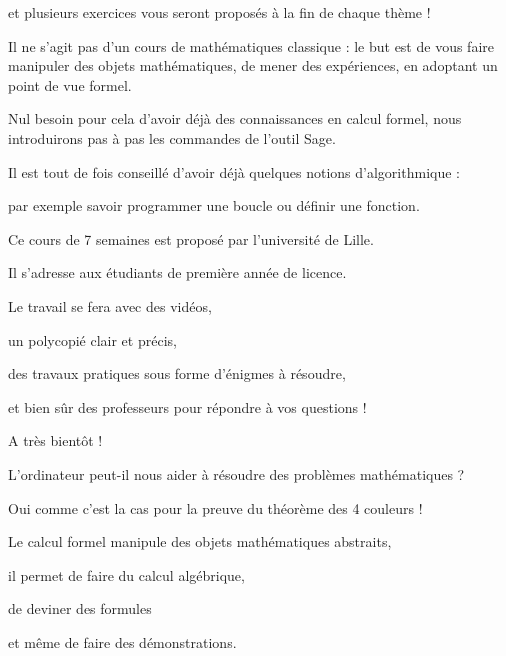 et plusieurs exercices vous seront proposés à la fin de chaque thème ! 

\change
 
Il ne s'agit pas d'un cours de mathématiques classique : le but est de vous faire manipuler des objets mathématiques, 
de mener des expériences, en adoptant un point de vue formel.

\change
Nul besoin pour cela d'avoir déjà des connaissances en calcul formel, nous introduirons pas à pas les commandes de l'outil Sage. 

\change
Il est tout de fois conseillé d'avoir déjà quelques notions d'algorithmique :

\change
par exemple savoir programmer une boucle ou définir une fonction.

\change

\change
Ce cours de 7 semaines est proposé par l'université de Lille.

Il s'adresse aux étudiants de première année de licence.

\change
Le travail se fera avec des vidéos,

\change
un polycopié clair et précis,

\change
des travaux pratiques sous forme d'énigmes à résoudre,

\change
et bien sûr des professeurs pour répondre à vos questions !

A très bientôt !




















\diapo


L'ordinateur peut-il nous aider à résoudre des problèmes mathématiques ?

Oui comme c'est la cas pour la preuve du théorème des 4 couleurs !

Le calcul formel manipule des objets mathématiques abstraits, 

il permet de faire du calcul algébrique, 

de deviner des formules 

et même de faire des démonstrations.

\change


